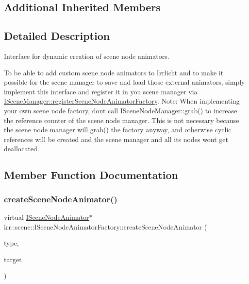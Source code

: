\subsection*{Additional Inherited Members}


\subsection{Detailed Description}
Interface for dynamic creation of scene node animators. 

To be able to add custom scene node animators to Irrlicht and to make it possible for the scene manager to save and load those external animators, simply implement this interface and register it in you scene manager via \hyperlink{classirr_1_1scene_1_1ISceneManager_af48c93cc41f986f08ed964cc575ee7a0}{I\+Scene\+Manager\+::register\+Scene\+Node\+Animator\+Factory}. Note\+: When implementing your own scene node factory, don\textquotesingle{}t call I\+Scene\+Node\+Manager\+::grab() to increase the reference counter of the scene node manager. This is not necessary because the scene node manager will \hyperlink{classirr_1_1IReferenceCounted_a396f9cdbe311ada278626477b3c6f0f5}{grab()} the factory anyway, and otherwise cyclic references will be created and the scene manager and all its nodes won\textquotesingle{}t get deallocated. 

\subsection{Member Function Documentation}
\mbox{\label{classirr_1_1scene_1_1ISceneNodeAnimatorFactory_a509845a16fa1fdd7241bb10416327eb2}} 
\subsubsection{\texorpdfstring{create\+Scene\+Node\+Animator()}{createSceneNodeAnimator()}\hspace{0.1cm}{\footnotesize\ttfamily [1/4]}}
{\footnotesize\ttfamily virtual \hyperlink{classirr_1_1scene_1_1ISceneNodeAnimator}{I\+Scene\+Node\+Animator}$\ast$ irr\+::scene\+::\+I\+Scene\+Node\+Animator\+Factory\+::create\+Scene\+Node\+Animator (\begin{DoxyParamCaption}\item[{\hyperlink{namespaceirr_1_1scene_a327a1e43872705cf8f3f3342fb307d19}{E\+S\+C\+E\+N\+E\+\_\+\+N\+O\+D\+E\+\_\+\+A\+N\+I\+M\+A\+T\+O\+R\+\_\+\+T\+Y\+PE}}]{type,  }\item[{\hyperlink{classirr_1_1scene_1_1ISceneNode}{I\+Scene\+Node} $\ast$}]{target }\end{DoxyParamCaption})\hspace{0.3cm}{\ttfamily [pure virtual]}}



